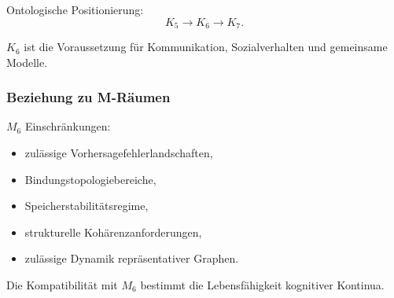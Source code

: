 Ontologische Positionierung:
\[
K_5 \to K_6 \to K_7.
\]

$K_6$ ist die Voraussetzung für Kommunikation, Sozialverhalten und gemeinsame Modelle.

\subsubsection{Beziehung zu M-Räumen}

$M_6$ Einschränkungen:
\begin{itemize}
    \item zulässige Vorhersagefehlerlandschaften,
    \item Bindungstopologiebereiche,
    \item Speicherstabilitätsregime,
    \item strukturelle Kohärenzanforderungen,
    \item zulässige Dynamik repräsentativer Graphen.
\end{itemize}

Die Kompatibilität mit $M_6$ bestimmt die Lebensfähigkeit kognitiver Kontinua.
